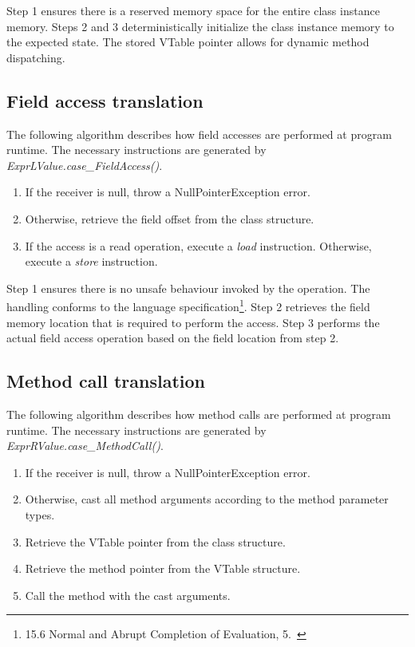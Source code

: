 \documentclass[]{tukportfolio}
\begin{document}
Step 1 ensures there is a reserved memory space for the entire class instance memory. Steps 2 and 3 deterministically initialize the class instance memory to the expected state. The stored VTable pointer allows for dynamic method dispatching.

\subsection{Field access translation}

The following algorithm describes how field accesses are performed at program runtime. The necessary instructions are generated by \textit{ExprLValue.case\_FieldAccess()}.

\begin{enumerate}
  \item If the receiver is null, throw a NullPointerException error\footnotemark.
  \item Otherwise, retrieve the field offset from the class structure.
  \item If the access is a read operation, execute a \textit{load} instruction. Otherwise, execute a \textit{store} instruction.
\end{enumerate}

Step 1 ensures there is no unsafe behaviour invoked by the operation. The handling conforms to the language specification\footnote{
  15.6 Normal and Abrupt Completion of Evaluation, 5.~\cite{javaspec}
}. Step 2 retrieves the field memory location that is required to perform the access. Step 3 performs the actual field access operation based on the field location from step 2.

\subsection{Method call translation}

The following algorithm describes how method calls are performed at program runtime. The necessary instructions are generated by \textit{ExprRValue.case\_MethodCall()}.

\begin{enumerate}
  \item If the receiver is null, throw a NullPointerException error.
  \item Otherwise, cast all method arguments according to the method parameter types.
  \item Retrieve the VTable pointer from the class structure.
  \item Retrieve the method pointer from the VTable structure.
  \item Call the method with the cast arguments.
\end{enumerate}
\end{document}
